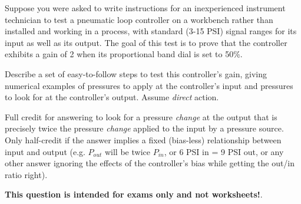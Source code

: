 

Suppose you were asked to write instructions for an inexperienced instrument technician to test a pneumatic loop controller on a workbench rather than installed and working in a process, with standard (3-15 PSI) signal ranges for its input as well as its output.  The goal of this test is to prove that the controller exhibits a gain of 2 when its proportional band dial is set to 50\%.

\vskip 10pt

Describe a set of easy-to-follow steps to test this controller's gain, giving numerical examples of pressures to apply at the controller's input and pressures to look for at the controller's output.  Assume {\it direct} action.







Full credit for answering to look for a pressure {\it change} at the output that is precisely twice the pressure {\it change} applied to the input by a pressure source.  Only half-credit if the answer implies a fixed (bias-less) relationship between input and output (e.g. $P_{out}$ will be twice $P_{in}$, or 6 PSI in = 9 PSI out, or any other answer ignoring the effects of the controller's bias while getting the out/in ratio right).







{\bf This question is intended for exams only and not worksheets!}.



